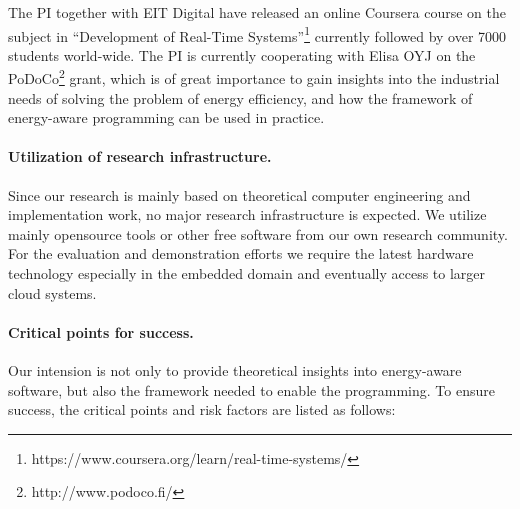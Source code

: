 \documentclass{article}
\begin{document}
The PI together with EIT Digital have released an online Coursera course on the subject in ``Development of Real-Time Systems''\footnote{https://www.coursera.org/learn/real-time-systems/} currently followed by over 7000 students world-wide.
The PI is currently cooperating with Elisa OYJ on the PoDoCo\footnote{http://www.podoco.fi/} grant, which is of great importance to gain insights into the industrial needs of solving the problem of energy efficiency, 
and how the framework of energy-aware programming can be used in practice.

\paragraph{Utilization of research infrastructure. }
Since our research is mainly based on theoretical computer engineering and implementation work, no major research infrastructure is expected.
We utilize mainly opensource tools or other free software from our own research community.
For the evaluation and demonstration efforts we require the latest hardware technology especially in the embedded domain and eventually access to larger cloud systems.

\paragraph{Critical points for success. }
Our intension is not only to provide theoretical insights into energy-aware software, but also the framework needed to enable the programming.
To ensure success, the critical points and risk factors are listed as follows:\smallskip
\end{document}
